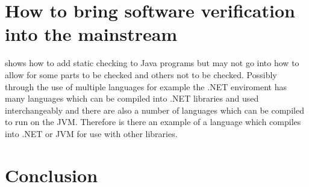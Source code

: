 \documentclass[a4paper,12pt]{scrartcl}
\begin{document}
	\section{How to bring software verification into the mainstream}
	{
		\cite{Flanagan2002} shows how to add static checking to Java programs but may not go into how to allow for some parts to be checked and others not to be checked. Possibly through the use of multiple languages for example the .NET enviroment has many languages which can be compiled into .NET libraries and used interchangeably and there are also a number of languages which can be compiled to run on the JVM. Therefore is there an example of a language which compiles into .NET or JVM for use with other libraries.
	}
	
	\section{Conclusion}
	{
	
	}
	
	\newpage
	
	\printbibliography[heading=bibintoc,title=References]
\end{document}

